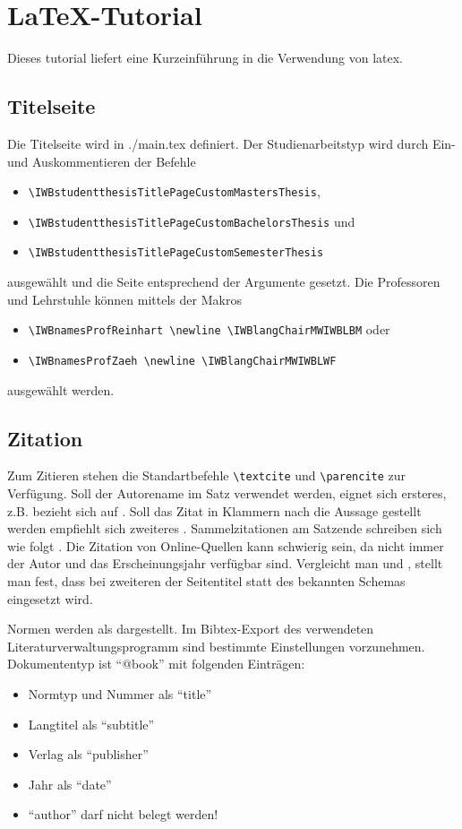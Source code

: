 \chapter{LaTeX-Tutorial}%
Dieses \gls{tutorial} liefert eine Kurzeinführung in die Verwendung von \gls{latex}.%
%
\section{Titelseite}%
Die Titelseite wird in {./main.tex} definiert. Der Studienarbeitstyp wird durch Ein- und Auskommentieren der Befehle%
\begin{itemize}%
	\item \verb|\IWBstudentthesisTitlePageCustomMastersThesis|,%
	\item \verb|\IWBstudentthesisTitlePageCustomBachelorsThesis| und%
	\item \verb|\IWBstudentthesisTitlePageCustomSemesterThesis|%
\end{itemize}%
ausgewählt und die Seite entsprechend der Argumente gesetzt. Die Professoren und Lehrstuhle können mittels der Makros%
\begin{itemize}%
	\item \verb|\IWBnamesProfReinhart \newline \IWBlangChairMWIWBLBM| oder%
	\item \verb|\IWBnamesProfZaeh \newline \IWBlangChairMWIWBLWF|%
\end{itemize}%
ausgewählt werden.%
%
\section{Zitation}%
%
Zum Zitieren stehen die Standartbefehle \verb|\textcite| und \verb|\parencite| zur Verfügung. Soll der Autorename im Satz verwendet werden, eignet sich ersteres, z.B. \textcite[2-3]{Bayerlein2018} bezieht sich auf \textcite{Bayerlein2016469}. Soll das Zitat in Klammern nach die Aussage gestellt werden empfiehlt sich zweiteres \parencite{Zaeh2018385}. Sammelzitationen am Satzende schreiben sich wie folgt \parencite{Kleinwort2018658,Kleinwort20189,Kleinwort2018631}. Die Zitation von Online-Quellen kann schwierig sein, da nicht immer der Autor und das Erscheinungsjahr verfügbar sind. Vergleicht man \textcite{Heuss2018} und \textcite{iwb-Startseite}, stellt man fest, dass bei zweiteren der Seitentitel statt des bekannten Schemas eingesetzt wird.\par%
%
Normen werden als \textcite{ISO.10218-2} dargestellt. Im Bibtex-Export des verwendeten Literaturverwaltungsprogramm sind bestimmte Einstellungen vorzunehmen. Dokumententyp ist \enquote{@book} mit folgenden Einträgen:
\begin{itemize}
	\item Normtyp und Nummer als \enquote{title}
	\item Langtitel als \enquote{subtitle}
	\item Verlag als \enquote{publisher}
	\item Jahr als \enquote{date}
	\item \enquote{author} darf nicht belegt werden!
\end{itemize}
%
